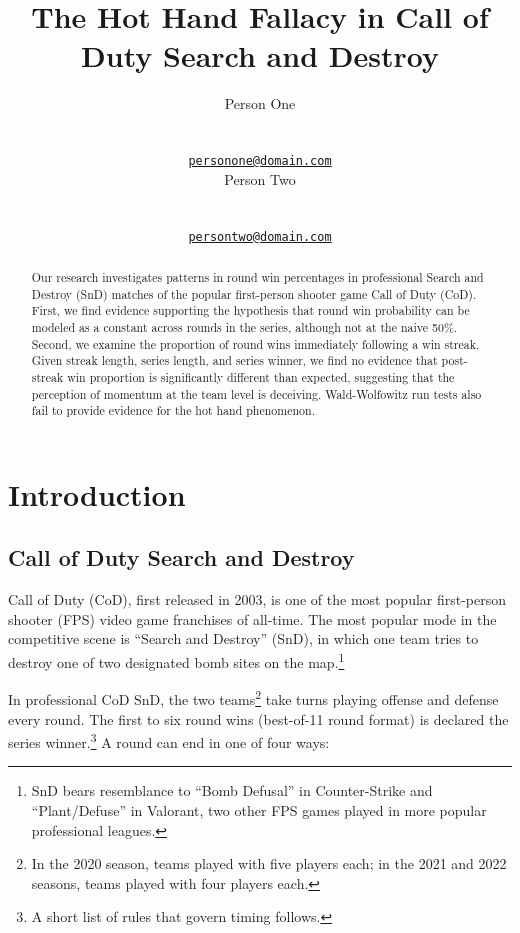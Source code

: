 \documentclass{article}
\title{The Hot Hand Fallacy in Call of Duty Search and Destroy}
\author{
    Person One
   \\
     \\
   \\
  \texttt{\href{mailto:personone@domain.com}{\nolinkurl{personone@domain.com}}} \\
   \And
    Person Two
   \\
     \\
   \\
  \texttt{\href{mailto:persontwo@domain.com}{\nolinkurl{persontwo@domain.com}}} \\
  }
\begin{document}
\maketitle


\begin{abstract}
Our research investigates patterns in round win percentages in
professional Search and Destroy (SnD) matches of the popular
first-person shooter game Call of Duty (CoD). First, we find evidence
supporting the hypothesis that round win probability can be modeled as a
constant across rounds in the series, although not at the naive 50\%.
Second, we examine the proportion of round wins immediately following a
win streak. Given streak length, series length, and series winner, we
find no evidence that post-streak win proportion is significantly
different than expected, suggesting that the perception of momentum at
the team level is deceiving. Wald-Wolfowitz run tests also fail to
provide evidence for the hot hand phenomenon.
\end{abstract}


\hypertarget{introduction}{%
\section{Introduction}\label{introduction}}

\hypertarget{call-of-duty-search-and-destroy}{%
\subsection{Call of Duty Search and
Destroy}\label{call-of-duty-search-and-destroy}}

Call of Duty (CoD), first released in 2003, is one of the most popular
first-person shooter (FPS) video game franchises of all-time. The most
popular mode in the competitive scene is ``Search and Destroy'' (SnD),
in which one team tries to destroy one of two designated bomb sites on
the map.\footnote{SnD bears resemblance to ``Bomb Defusal'' in
  Counter-Strike and ``Plant/Defuse'' in Valorant, two other FPS games
  played in more popular professional leagues.}

In professional CoD SnD, the two teams\footnote{In the 2020 season,
  teams played with five players each; in the 2021 and 2022 seasons,
  teams played with four players each.} take turns playing offense and
defense every round. The first to six round wins (best-of-11 round
format) is declared the series winner.\footnote{A short list of rules
  that govern timing follows.} A round can end in one of four ways:
\end{document}
